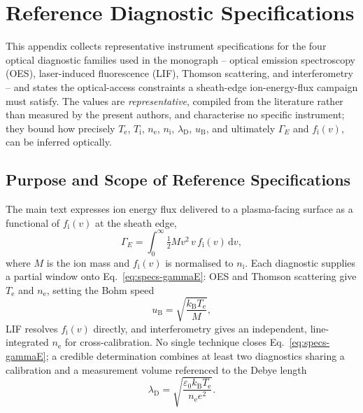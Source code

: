 \chapter{Reference Diagnostic Specifications}
\label{app:specs}

This appendix collects representative instrument specifications for the four optical diagnostic families used in the monograph -- optical emission spectroscopy (OES), laser-induced fluorescence (LIF), Thomson scattering, and interferometry -- and states the optical-access constraints a sheath-edge ion-energy-flux campaign must satisfy. The values are \emph{representative}, compiled from the literature rather than measured by the present authors, and characterise no specific instrument; they bound how precisely $T_{\mathrm{e}}$, $T_{\mathrm{i}}$, $n_{\mathrm{e}}$, $n_{\mathrm{i}}$, $\lambda_{\mathrm{D}}$, $u_{\mathrm{B}}$, and ultimately $\Gamma_{E}$ and $f_{\mathrm{i}}(v)$, can be inferred optically.

\section{Purpose and Scope of Reference Specifications}
\label{sec:specs-scope}

The main text expresses ion energy flux delivered to a plasma-facing surface as a functional of $f_{\mathrm{i}}(v)$ at the sheath edge,
\begin{equation}
\Gamma_{E} = \int_{0}^{\infty} \tfrac{1}{2} M v^{2} \, v \, f_{\mathrm{i}}(v) \, \mathrm{d}v ,
\label{eq:specs-gammaE}
\end{equation}
where $M$ is the ion mass and $f_{\mathrm{i}}(v)$ is normalised to $n_{\mathrm{i}}$. Each diagnostic supplies a partial window onto Eq.~\eqref{eq:specs-gammaE}: OES and Thomson scattering give $T_{\mathrm{e}}$ and $n_{\mathrm{e}}$, setting the Bohm speed
\begin{equation}
u_{\mathrm{B}} = \sqrt{\frac{k_{\mathrm{B}} T_{\mathrm{e}}}{M}} ,
\label{eq:specs-bohm}
\end{equation}
LIF resolves $f_{\mathrm{i}}(v)$ directly, and interferometry gives an independent, line-integrated $n_{\mathrm{e}}$ for cross-calibration. No single technique closes Eq.~\eqref{eq:specs-gammaE}; a credible determination combines at least two diagnostics sharing a calibration and a measurement volume referenced to the Debye length
\begin{equation}
\lambda_{\mathrm{D}} = \sqrt{\frac{\varepsilon_{0} k_{\mathrm{B}} T_{\mathrm{e}}}{n_{\mathrm{e}} e^{2}}} .
\label{eq:specs-debye}
\end{equation}


